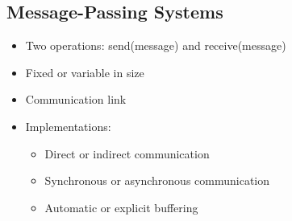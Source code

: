 \documentclass[10pt]{report}
\begin{document}
		\subsection{Message-Passing Systems}
			\begin{itemize}
				\item Two operations: send(message) and receive(message)
				\item Fixed or variable in size
				\item Communication link
				\item Implementations:
				\begin{itemize}
					\item Direct or indirect communication
					\item Synchronous or asynchronous communication
					\item Automatic or explicit buffering
				\end{itemize}
			\end{itemize}
\end{document}
